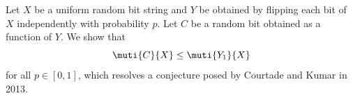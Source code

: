 \renewenvironment{abstract}{\small \list{}{%
    \setlength{\leftmargin}{10mm}%
    \setlength{\rightmargin}{\leftmargin}%
    \listparindent 0em%
  }\item{}}{\endlist}

\begin{abstract}
Let $X$ be a uniform random bit string and $Y$ be obtained
by flipping each bit of $X$ independently with probability
$p$.
Let $C$ be a random bit obtained as a function of $Y$. We
show that $$\muti{C}{X}\le \muti{Y_1}{X}$$ for all
$p\in[0,1]$, which resolves a conjecture posed by
Courtade and Kumar in 2013.
\end{abstract}

